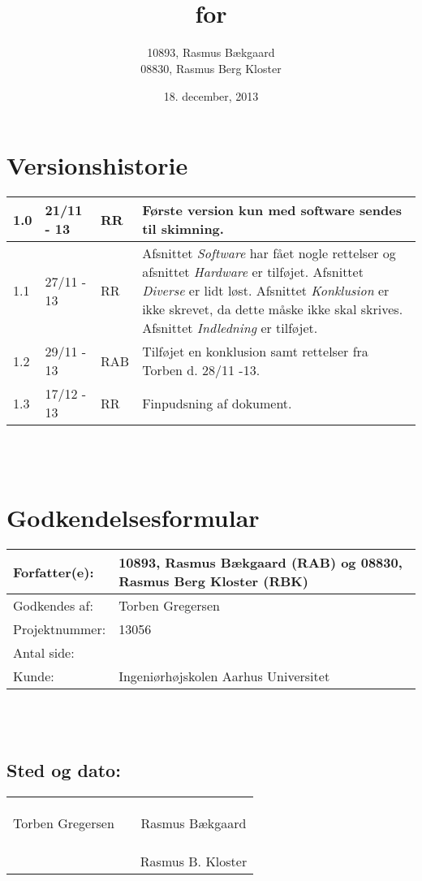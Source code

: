 \documentclass[oneside, 12pt]{memoir}
\title{\DocumentType \\ for \\ \ProjectName}
\date{18. december, 2013}
\author{10893, Rasmus Bækgaard\\08830, Rasmus Berg Kloster}
\begin{document}
\begin{titlingpage}
  \maketitle
\end{titlingpage}


\section*{Versionshistorie}
\begin{tabular}{p{}|p{}|p{}|p{}}
\hline 
1.0 & 21/11 - 13 & RR & Første version kun med software sendes til skimning.
\\ \hline
1.1 & 27/11 - 13 & RR & Afsnittet \textit{Software} har fået nogle rettelser og afsnittet \textit{Hardware} er tilføjet. Afsnittet \textit{Diverse} er lidt løst.
Afsnittet \textit{Konklusion} er ikke skrevet, da dette måske ikke skal skrives.
Afsnittet \textit{Indledning} er tilføjet.
\\ \hline
1.2 & 29/11 - 13 & RAB & Tilføjet en konklusion samt rettelser fra Torben d. 28/11 -13.\\
1.3 & 17/12 - 13 & RR & Finpudsning af dokument. \\ \hline
\end{tabular} 
\\
\\
\section*{Godkendelsesformular}
\begin{tabular}{p{}|p{}}
\hline 
Forfatter(e): & 10893, Rasmus Bækgaard (RAB) og 08830, Rasmus Berg Kloster (RBK)\\ 
\hline 
Godkendes af: & Torben Gregersen \\ 
\hline
Projektnummer: & 13056\\
\hline
Antal side: & \pageref{LastPage} \\
\hline 
Kunde: & Ingeniørhøjskolen Aarhus Universitet \\
\hline
\end{tabular} 
\\
\\
\subsection*{Sted og dato:}
\begin{tabular}{c p{} c}
&& \\
&& \\
\underline{\qquad \qquad \qquad \qquad \qquad \qquad \qquad} & \qquad & \underline{\qquad \qquad \qquad \qquad \qquad \qquad \qquad}  \\ 
Torben Gregersen & & Rasmus Bækgaard \\ \\\\
&&  \underline{\qquad \qquad \qquad \qquad \qquad \qquad \qquad}  \\
& & Rasmus B. Kloster
\end{tabular} 
\end{document}
